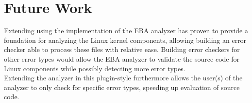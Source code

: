 \section{Future Work}

\noindent Extending using the implementation of the EBA analyzer has proven to provide a foundation for analyzing the Linux kernel components, allowing building an error checker able to process these files with relative ease. 
Building error checkers for other error types would allow the EBA analyzer to validate the source code for Linux components while possibly detecting more error types. \\

\noindent Extending the analyzer in this plugin-style furthermore allows the user(s) of the analyzer to only check for specific error types, speeding up evaluation of source code.
